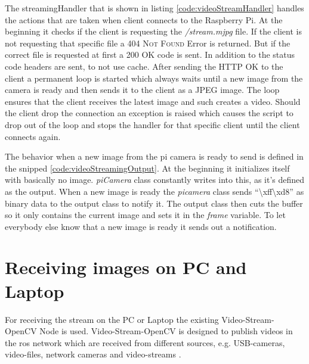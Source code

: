 The streamingHandler that is shown in listing \ref{code:videoStreamHandler} handles the actions that are taken when client connects to the Raspberry Pi. At the beginning it checks if the client is requesting the \textit{/stream.mjpg} file. If the client is not requesting that specific file a \textsc{404 Not Found} Error is returned. But if the correct file is requested at first a \textsc{200 OK} code is sent. In addition to the status code headers are sent, to not use cache. After sending the \textsc{HTTP OK} to the client a permanent loop is started which always waits until a new image from the camera is ready and then sends it to the client as a JPEG image. The loop ensures that the client receives the latest image and such creates a video. Should the client drop the connection an exception is raised which causes the script to drop out of the loop and stops the handler for that specific client until the client connects again.\newline


The behavior when a new image from the pi camera is ready to send is defined in the snipped \ref{code:videoStreamingOutput}. At the beginning it initializes itself with basically no image. \textit{piCamera} class constantly writes into this, as it's defined as the output. When a new image is ready the \textit{picamera} class sends \enquote{\textbackslash xff\textbackslash xd8} as binary data to the output class to notify it. The output class then cuts the buffer so it only contains the current image and sets it in the \textit{frame} variable. To let everybody else know that a new image is ready it sends out a notification.\newline



\section{Receiving images on PC and Laptop\authorA}
For receiving the stream on the PC or Laptop the existing Video-Stream-OpenCV Node is used. Video-Stream-OpenCV is designed to publish videos in the \gls{ros} network which are received from different sources, e.g. USB-cameras, video-files, network cameras and video-streams \cite{videostreamopencv}.

